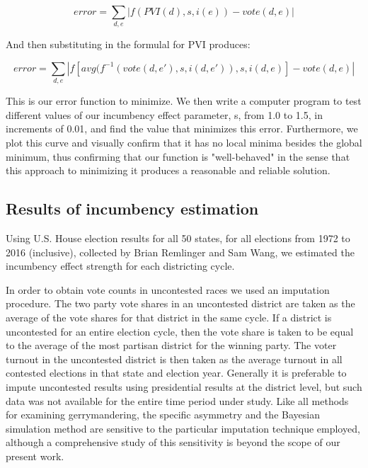 \documentclass[preprint,12pt]{article}
\begin{document}
\begin{equation}
error = \sum_{d,e}{\left|  f(PVI(d),s,i(e)) - vote(d,e)\right|}
\end{equation}

And then substituting in the formulal for PVI produces:

\begin{equation}
error = \sum_{d,e}{\left|  f[ avg(f^{-1}(vote(d,e'),s,i(d,e')) ,s,i(d,e) ] - vote(d,e)\right|}
\end{equation}

This is our error function to minimize.  We then write a computer program to test different values of our incumbency effect parameter, s, from 1.0 to 1.5, in increments of 0.01, and find the value that minimizes this error.  Furthermore, we plot this curve and visually confirm that it has no local minima besides the global minimum, thus confirming that our function is "well-behaved" in the sense that this approach to minimizing it produces a reasonable and reliable solution.

\subsection{Results of incumbency estimation}

Using U.S. House election results for all 50 states, for all elections from 1972 to 2016 (inclusive), collected by Brian Remlinger and Sam Wang, we estimated the incumbency effect strength for each districting cycle.  

In order to obtain vote counts in uncontested races we used an imputation procedure. The two party vote shares in an uncontested district are taken as the average of the vote shares for that district in the same cycle. If a district is uncontested for an entire election cycle, then the vote share is taken to be equal to the average of the most partisan district for the winning party. The voter turnout in the uncontested district is then taken as the average turnout in all contested elections in that state and election year. Generally it is preferable to impute uncontested results using presidential results at the district level, but such data was not available for the entire time period under study. Like all methods for examining gerrymandering, the specific asymmetry and the Bayesian simulation method are sensitive to the particular imputation technique employed, although a comprehensive study of this sensitivity is beyond the scope of our present work.
\end{document}
